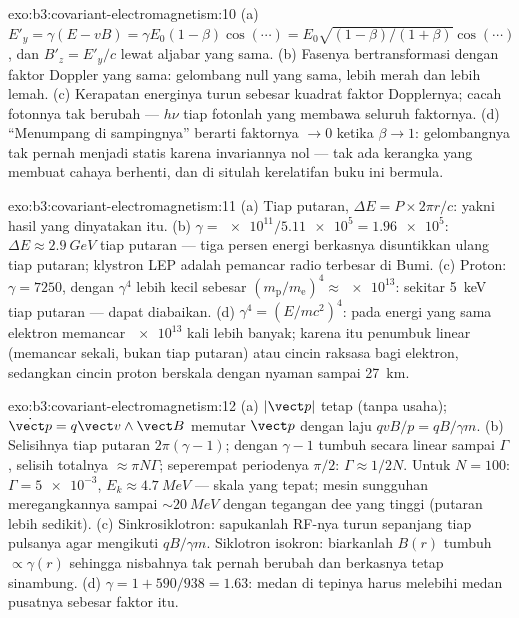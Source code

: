 \begin{solution}{exo:b3:covariant-electromagnetism:10}
(a) $E'_y = \gamma(E - vB) = \gamma E_0(1 - \beta)\cos(\cdots) =
E_0\sqrt{(1-\beta)/(1+\beta)}\cos(\cdots)$, dan $B'_z = E'_y/c$ lewat
aljabar yang sama. (b) Fasenya bertransformasi dengan faktor Doppler
yang sama: gelombang null yang sama, lebih merah dan lebih lemah. (c)
Kerapatan energinya turun sebesar kuadrat faktor Dopplernya; cacah
fotonnya tak berubah --- $h\nu$ tiap fotonlah yang membawa seluruh
faktornya. (d) ``Menumpang di sampingnya'' berarti faktornya $\to 0$
ketika $\beta \to 1$: gelombangnya tak pernah menjadi statis karena
invariannya nol --- tak ada kerangka yang membuat cahaya berhenti, dan di
situlah kerelatifan buku ini bermula.
\end{solution}

\begin{solution}{exo:b3:covariant-electromagnetism:11}
(a) Tiap putaran, $\Delta E = P \times 2\pi r/c$: yakni hasil yang
dinyatakan itu. (b)
$\gamma = \num{e11}/\num{5.11e5} = \num{1.96e5}$: $\Delta E \approx
\qty{2.9}{GeV}$ tiap putaran --- tiga persen energi berkasnya
disuntikkan ulang tiap putaran; klystron LEP adalah pemancar radio
terbesar di Bumi. (c) Proton: $\gamma = 7250$, dengan $\gamma^4$
lebih kecil sebesar $(m_{\text{p}}/m_{\text{e}})^4 \approx \num{e13}$: sekitar
\qty{5}{keV} tiap putaran --- dapat diabaikan. (d) $\gamma^4 = (E/mc^2)^4$:
pada energi yang sama elektron memancar $\num{e13}$ kali lebih banyak;
karena itu penumbuk linear (memancar sekali, bukan tiap putaran) atau
cincin raksasa bagi elektron, sedangkan cincin proton berskala dengan
nyaman sampai \qty{27}{km}.
\end{solution}

\begin{solution}{exo:b3:covariant-electromagnetism:12}
(a) $|\vect p|$ tetap (tanpa usaha); $\dot{\vect p} = q\vect
v\wedge\vect B$ memutar $\vect p$ dengan laju $qvB/p = qB/\gamma m$. (b)
Selisihnya tiap putaran $2\pi(\gamma - 1)$; dengan $\gamma - 1$ tumbuh
secara linear sampai $\Gamma$, selisih totalnya $\approx \pi N\Gamma$;
seperempat periodenya $\pi/2$: $\Gamma \approx 1/2N$. Untuk $N = 100$: $\Gamma =
\num{5e-3}$, $E_k \approx \qty{4.7}{MeV}$ --- skala yang tepat; mesin
sungguhan meregangkannya sampai $\sim\qty{20}{MeV}$ dengan tegangan dee
yang tinggi (putaran lebih sedikit). (c) Sinkrosiklotron: sapukanlah RF-nya
turun sepanjang tiap pulsanya agar mengikuti $qB/\gamma m$. Siklotron
isokron: biarkanlah $B(r)$ tumbuh $\propto\gamma(r)$ sehingga nisbahnya tak
pernah berubah dan berkasnya tetap sinambung. (d) $\gamma = 1 + 590/938 = 1.63$:
medan di tepinya harus melebihi medan pusatnya sebesar faktor itu.
\end{solution}

